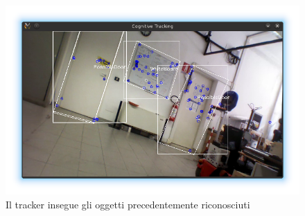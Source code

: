 \begin{figure}[ht]
  \includegraphics[width=\textwidth]{immagini/risultati/tracker2}
  \caption[Track precedenti da un nuovo punto di vista]{Il tracker insegue gli oggetti precedentemente riconosciuti}
  \label{fig:tracker2}
\end{figure}